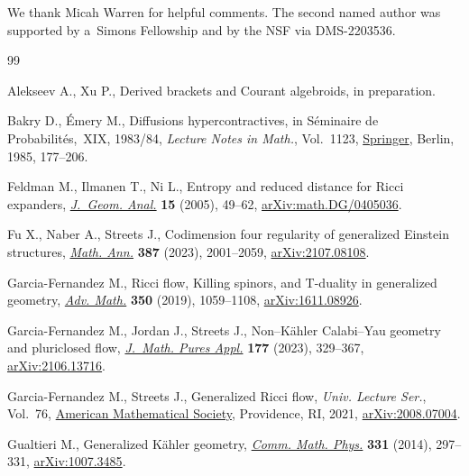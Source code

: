 \documentclass[pdftex]{sigma}
\numberwithin{equation}{section}
\begin{document}
We thank Micah Warren for helpful comments. The second named author was supported by a~Simons Fellowship and by the NSF via DMS-2203536.

%
%

\begin{thebibliography}{99}
\footnotesize\itemsep=0pt

Alekseev A., Xu P., Derived brackets and {C}ourant algebroids, {i}n
 preparation.

Bakry D., \'Emery M., Diffusions hypercontractives, in S\'eminaire de
 {P}robabilit\'es,~{XIX}, 1983/84, \textit{Lecture Notes in Math.}, Vol.~1123,
 \href{https://doi.org/10.1007/BFb0075847}{Springer}, Berlin, 1985, 177--206.

Feldman M., Ilmanen T., Ni L., Entropy and reduced distance for {R}icci
 expanders, \href{https://doi.org/10.1007/BF02921858}{\textit{J.~Geom. Anal.}} \textbf{15} (2005), 49--62,
 \href{https://arxiv.org/abs/math.DG/0405036}{arXiv:math.DG/0405036}.

Fu X., Naber A., Streets J., Codimension four regularity of generalized
 {E}instein structures, \href{https://doi.org/10.1007/s00208-022-02516-3}{\textit{Math. Ann.}} \textbf{387} (2023), 2001--2059,
 \href{https://arxiv.org/abs/2107.08108}{arXiv:2107.08108}.

Garcia-Fernandez M., Ricci flow, {K}illing spinors, and {T}-duality in
 generalized geometry, \href{https://doi.org/10.1016/j.aim.2019.04.038}{\textit{Adv. Math.}} \textbf{350} (2019), 1059--1108,
 \href{https://arxiv.org/abs/1611.08926}{arXiv:1611.08926}.

Garcia-Fernandez M., Jordan J., Streets J., Non--{K}\"ahler {C}alabi--{Y}au
 geometry and pluriclosed flow, \href{https://doi.org/10.1016/j.matpur.2023.07.002}{\textit{J.~Math. Pures Appl.}} \textbf{177}
 (2023), 329--367, \href{https://arxiv.org/abs/2106.13716}{arXiv:2106.13716}.

Garcia-Fernandez M., Streets J., Generalized {R}icci flow, \textit{Univ.
 Lecture Ser.}, Vol.~76, \href{https://doi.org/10.1090/ulect/076}{American Mathematical Society}, Providence, RI, 2021,
 \href{https://arxiv.org/abs/2008.07004}{arXiv:2008.07004}.

Gualtieri M., Generalized {K}\"ahler geometry, \href{https://doi.org/10.1007/s00220-014-1926-z}{\textit{Comm. Math. Phys.}}
 \textbf{331} (2014), 297--331, \href{https://arxiv.org/abs/1007.3485}{arXiv:1007.3485}.


\end{thebibliography}
\end{document}
